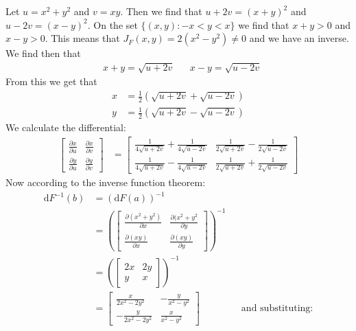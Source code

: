 \documentclass[12pt]{book}
\newenvironment{exercise}[2][Exercise]{\begin{trivlist}
\item[\hskip \labelsep {\bfseries #1}\hskip \labelsep {\bfseries #2.}]}{\end{trivlist}}
\begin{document}
\begin{exercise}{7.2.7}
\begin{exercise}{9.6.2}
    Let $u=x^2+y^2$ and $v = x y$. Then we find that $u+2v = (x+y)^2$ and $u-2v=(x-y)^2$. On the set $\{(x,y) : -x < y < x\}$ we find that $x+y>0$ and $x-y>0$. This means that $J_F (x,y) = 2 (x^2-y^2)\neq 0$ and we have an inverse. We find then that
    \begin{align*}
        &x+y=\sqrt{u+2v}        &&x-y=\sqrt{u-2v}
    \end{align*}
    From this we get that
    \begin{align*}
        x &= \frac{1}{2} \left( \sqrt{u+2v} + \sqrt{u-2v} \right) \\
        y &= \frac{1}{2} \left( \sqrt{u+2v} - \sqrt{u-2v} \right)
    \end{align*}
    We calculate the differential:
    \begin{align*}
    \begin{bmatrix} \frac{\partial x}{\partial u} & \frac{\partial x}{\partial v} \\ \frac{\partial y}{\partial u} & \frac{\partial y}{\partial v} \end{bmatrix} &= \left[\begin{matrix}\frac{1}{4 \sqrt{u + 2 v}} + \frac{1}{4 \sqrt{u - 2 v}} & \frac{1}{2 \sqrt{u + 2 v}} - \frac{1}{2 \sqrt{u - 2 v}}\\\frac{1}{4 \sqrt{u + 2 v}} - \frac{1}{4 \sqrt{u - 2 v}} & \frac{1}{2 \sqrt{u + 2 v}} + \frac{1}{2 \sqrt{u - 2 v}}\end{matrix}\right]
    \end{align*}
    Now according to the inverse function theorem:
    \begin{align*}
        \text{d} F^{-1} (b) &= \left( \text{d}F(a) \right)^{-1} \\
                            &= \left( \begin{bmatrix} \frac{\partial (x^2+y^2)}{\partial x} & \frac{\partial (x^2+y^2}{\partial y} \\ \frac{\partial(xy)}{\partial x} & \frac{\partial(xy)}{\partial y} \end{bmatrix} \right)^{-1} \\
                            &= \left( \begin{bmatrix} 2x & 2y \\ y  & x \end{bmatrix}  \right)^{-1} \\
                            &= \left[\begin{matrix}\frac{x}{2 x^{2} - 2 y^{2}} & - \frac{y}{x^{2} - y^{2}}\\- \frac{y}{2 x^{2} - 2 y^{2}} & \frac{x}{x^{2} - y^{2}}\end{matrix}\right] && \text{and substituting:} \\

\end{align*}
\end{exercise}
\end{exercise}
\end{document}
